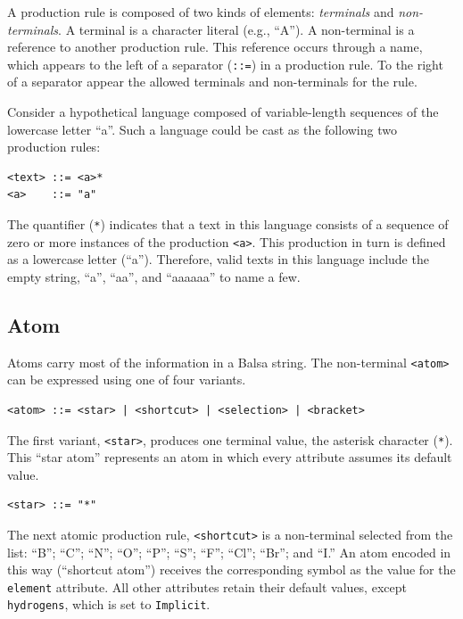 \documentclass{article}
\def\ttt{\texttt}
\begin{document}
A production rule is composed of two kinds of elements: \textit{terminals} and \textit{non-terminals}. A terminal is a character literal (e.g., \enquote{A}). A non-terminal is a reference to another production rule. This reference occurs through a name, which appears to the left of a separator (\ttt{::=}) in a production rule. To the right of a separator appear the allowed terminals and non-terminals for the rule.

Consider a hypothetical language composed of variable-length sequences of the lowercase letter \enquote{a}. Such a language could be cast as the following two production rules:

\begin{lstlisting}
<text> ::= <a>*
<a>    ::= "a"
\end{lstlisting}

The quantifier (\ttt{*}) indicates that a text in this language consists of a sequence of zero or more instances of the production \ttt{<a>}. This production in turn is defined as a lowercase letter (\enquote{a}). Therefore, valid texts in this language include the empty string, \enquote{a}, \enquote{aa}, and \enquote{aaaaaa} to name a few.

\subsection*{Atom}

Atoms carry most of the information in a Balsa string. The non-terminal \ttt{<atom>} can be expressed using one of four variants.

\begin{lstlisting}
<atom> ::= <star> | <shortcut> | <selection> | <bracket>
\end{lstlisting}

The first variant, \ttt{<star>}, produces one terminal value, the asterisk character (\ttt{*}). This \enquote{star atom} represents an atom in which every attribute assumes its default value.

\begin{lstlisting}
<star> ::= "*"
\end{lstlisting}

The next atomic production rule, \ttt{<shortcut>} is a non-terminal selected from the list: \enquote{B}; \enquote{C}; \enquote{N}; \enquote{O}; \enquote{P}; \enquote{S}; \enquote{F}; \enquote{Cl}; \enquote{Br}; and \enquote{I.} An atom encoded in this way (\enquote{shortcut atom}) receives the corresponding symbol as the value for the \ttt{element} attribute. All other attributes retain their default values, except \ttt{hydrogens}, which is set to \ttt{Implicit}.
\end{document}
